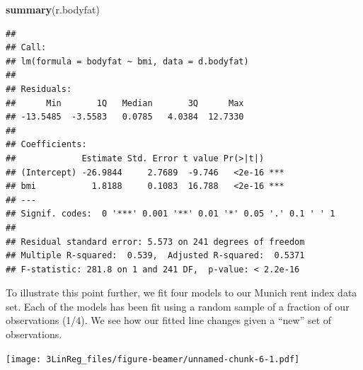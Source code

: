 \documentclass[10pt,ignorenonframetext,]{beamer}
\newenvironment{Shaded}{\begin{snugshade}}{\end{snugshade}}
\newcommand{\KeywordTok}[1]{\textcolor[rgb]{0.13,0.29,0.53}{\textbf{#1}}}
\newcommand{\NormalTok}[1]{#1}
\begin{document}
\begin{frame}[fragile]

\small

\begin{Shaded}
\begin{Highlighting}[]
\KeywordTok{summary}\NormalTok{(r.bodyfat)}
\end{Highlighting}
\end{Shaded}

\begin{verbatim}
## 
## Call:
## lm(formula = bodyfat ~ bmi, data = d.bodyfat)
## 
## Residuals:
##      Min       1Q   Median       3Q      Max 
## -13.5485  -3.5583   0.0785   4.0384  12.7330 
## 
## Coefficients:
##             Estimate Std. Error t value Pr(>|t|)    
## (Intercept) -26.9844     2.7689  -9.746   <2e-16 ***
## bmi           1.8188     0.1083  16.788   <2e-16 ***
## ---
## Signif. codes:  0 '***' 0.001 '**' 0.01 '*' 0.05 '.' 0.1 ' ' 1
## 
## Residual standard error: 5.573 on 241 degrees of freedom
## Multiple R-squared:  0.539,  Adjusted R-squared:  0.5371 
## F-statistic: 281.8 on 1 and 241 DF,  p-value: < 2.2e-16
\end{verbatim}

\normalsize

\end{frame}

\begin{frame}

To illustrate this point further, we fit four models to our Munich rent
index data set. Each of the models has been fit using a random sample of
a fraction of our observations (1/4). We see how our fitted line changes
given a ``new'' set of observations.

\texttt{[image: 3LinReg\_files/figure-beamer/unnamed-chunk-6-1.pdf]}

\end{frame}
\end{document}
